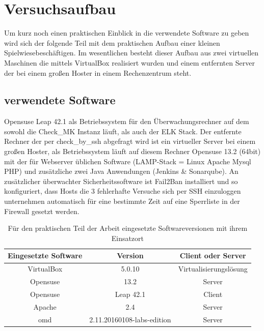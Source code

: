 \documentclass[12pt,a4paper,parskip]{scrreprt}
\begin{document}
	\section{Versuchsaufbau}
	Um kurz noch einen praktischen Einblick in die verwendete Software zu geben wird sich der folgende Teil mit dem praktischen Aufbau einer kleinen \glqq Spielwiese\grqq beschäftigen. Im wesentlichen besteht dieser Aufbau aus zwei virtuellen Maschinen die mittels VirtualBox realisiert wurden und einem entfernten Server der bei einem großen Hoster in einem Rechenzentrum steht.
	\subsection{verwendete Software}
	Opensuse Leap 42.1 als Betriebssystem für den Überwachungsrechner auf dem sowohl die Check\_MK Instanz läuft, als auch der ELK Stack. Der entfernte Rechner der per check\_by\_ssh abgefragt wird ist ein virtueller Server bei einem großen Hoster, als Betriebssystem läuft auf diesem Rechner Opensuse 13.2 (64bit) mit der für Webserver üblichen Software (LAMP-Stack = Linux Apache Mysql PHP) und zusätzliche zwei Java Anwendungen (Jenkins \& Sonarqube). An zusätzlicher überwachter Sicherheitssoftware ist Fail2Ban installiert und so konfiguriert, dass Hosts die 3 fehlerhafte Versuche sich per SSH einzuloggen unternehmen automatisch für eine bestimmte Zeit auf eine Sperrliste in der Firewall gesetzt werden. \\
	\begin{table}[h] %
	\begin{center}
	\begin{tabular}{|c|c|c|}
	\hline 
	Eingesetzte Software & Version & Client oder Server \\ 
	\hline 
	VirtualBox & 5.0.10 & Virtualisierungslösung\\
	\hline
	Opensuse & 13.2 & Server\\ 
	\hline 
	Opensuse & Leap 42.1 & Client\\
	\hline
	Apache & 2.4 & Server\\
	\hline
	\acrshort{omd} & 2.11.20160108-labs-edition & Server\\
	\hline
	\end{tabular} 
	\caption[Eingesetzte Softwareversionen]{Für den praktischen Teil der Arbeit eingesetzte Softwareversionen mit ihrem Einsatzort}
	\end{center}
	\end{table}
\end{document}
